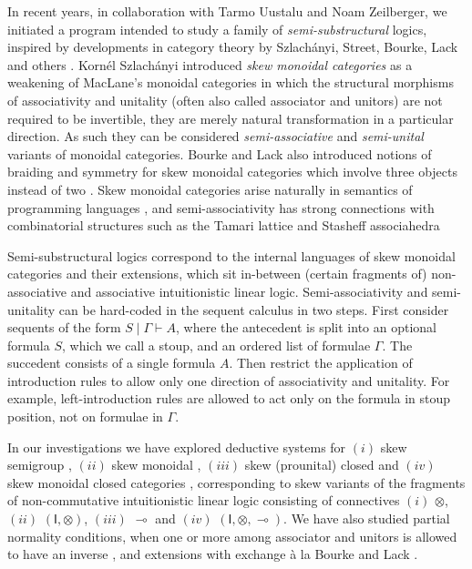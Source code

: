 \documentclass[submission,copyright,creativecommons]{eptcs}
\theoremstyle{definition}
\newcommand{\lolli}{\multimap}
\newcommand{\I}{\mathsf{I}}
\begin{document}
In recent years, in collaboration with Tarmo Uustalu and Noam Zeilberger, we initiated a program intended to study a family of \emph{semi-substructural} logics, inspired by developments in category theory by Szlach{\'a}nyi, Street, Bourke, Lack and others \cite{szlachanyi:skew-monoidal:2012,lack:skew:2012,street:skew-closed:2013,lack:triangulations:2014,buckley:catalan:2015,bourke:skew:2017,bourke:skew:2018,bourke:lack:braided:2020}. Korn{\'e}l Szlach\'anyi introduced \emph{skew monoidal categories} as a weakening of MacLane's monoidal categories in which the structural morphisms of associativity and unitality (often also called associator and unitors) are not required to be invertible, they are merely natural transformation in a particular direction. As such they can be considered \emph{semi-associative} and \emph{semi-unital} variants of monoidal categories. Bourke and Lack also introduced notions of braiding and symmetry for skew monoidal categories which involve three objects instead of two \cite{bourke:lack:braided:2020}. Skew monoidal categories arise naturally in semantics of programming languages \cite{altenkirch:monads:2014}, and semi-associativity has strong connections with combinatorial structures such as the Tamari lattice and Stasheff associahedra \cite{zeilberger:semiassociative:19,moortgat:tamari:20}

Semi-substructural logics correspond to the internal languages of skew monoidal categories and their extensions, which sit in-between (certain fragments of) non-associative and associative intuitionistic linear logic. Semi-associativity and semi-unitality can be hard-coded in the sequent calculus in two steps. First consider sequents of the form $S \mid \Gamma \vdash A$, where the antecedent is split into an optional formula $S$, which we call a stoup, and an ordered list of formulae $\Gamma$. The succedent consists of a single formula $A$. Then restrict the application of introduction rules to allow only one direction of associativity and unitality. For example, left-introduction rules are allowed to act only on the formula in stoup position, not on formulae in $\Gamma$.

In our investigations we have explored deductive systems for $(i)$ skew semigroup \cite{zeilberger:semiassociative:19}, $(ii)$ skew monoidal \cite{uustalu:sequent:2021}, $(iii)$ skew (prounital) closed \cite{uustalu:deductive:nodate} and $(iv)$ skew monoidal closed categories \cite{UVW:protsn}, corresponding to skew variants of the fragments of non-commutative intuitionistic linear logic consisting of connectives $(i)$ $\otimes$, $(ii)$ $(\I,\otimes)$, $(iii)$ $\lolli$ and $(iv)$ $(\I,\otimes,\lolli)$. We have also studied partial normality conditions, when one or more among associator and unitors is allowed to have an inverse \cite{uustalu:proof:nodate}, and extensions with exchange {\`a} la Bourke and Lack \cite{veltri:coherence:2021}.
\end{document}

